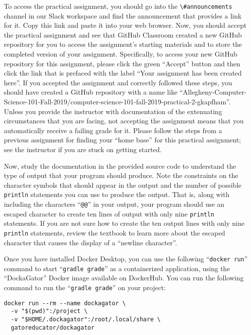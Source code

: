 \documentclass[11pt]{article}
\newcommand{\command}[1]{``\lstinline{#1}''}
\newcommand{\channel}[1]{\lstinline{#1}}
\begin{document}
To access the practical assignment, you should go into the
\channel{\#announcements} channel in our Slack workspace and find the
announcement that provides a link for it. Copy this link and paste it into your
web browser. Now, you should accept the practical assignment and see that GitHub
Classroom created a new GitHub repository for you to access the assignment's
starting materials and to store the completed version of your assignment.
Specifically, to access your new GitHub repository for this assignment, please
click the green ``Accept'' button and then click the link that is prefaced with
the label ``Your assignment has been created here''. If you accepted the
assignment and correctly followed these steps, you should have created a GitHub
repository with a name like
``Allegheny-Computer-Science-101-Fall-2019/computer-science-101-fall-2019-practical-2-gkapfham''.
Unless you provide the instructor with documentation of the extenuating
circumstances that you are facing, not accepting the assignment means that you
automatically receive a failing grade for it. Please follow the steps from a
previous assignment for finding your ``home base'' for this practical
assignment; see the instructor if you are stuck on getting started.

Now, study the documentation in the provided source code to understand the type
of output that your program should produce. Note the constraints on the
character symbols that should appear in the output and the number of possible
{\tt println} statements you can use to produce the output. That is, along with
including the characters ``{\tt @@}'' in your output, your program should use an
escaped character to create ten lines of output with only nine {\tt println}
statements. If you are not sure how to create the ten output lines with only
nine {\tt println} statements, review the textbook to learn more about the
escaped character that causes the display of a ``newline character''.

Once you have installed Docker Desktop, you can use the following
\command{docker run} command to start \command{gradle grade} as a containerized
application, using the ``DockaGator'' Docker image available on DockerHub. You
can run the following command to run the \command{gradle grade} on your project:

\vspace*{-.05in}
\begin{verbatim}
docker run --rm --name dockagator \
  -v "$(pwd)":/project \
  -v "$HOME/.dockagator":/root/.local/share \
  gatoreducator/dockagator
\end{verbatim}
\vspace*{-.05in}
\end{document}
